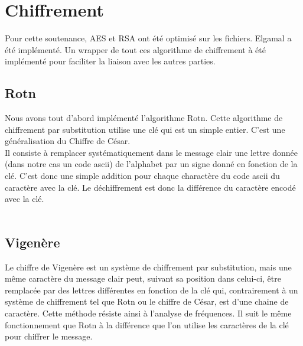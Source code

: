 \section{Chiffrement}
    
        Pour cette soutenance, AES et RSA ont été optimisé sur les fichiers. Elgamal a été implémenté.
        Un wrapper de tout ces algorithme de chiffrement à été implémenté pour faciliter la liaison avec les autres parties.

        \subsection{Rotn}
        Nous avons tout d’abord implémenté l’algorithme Rotn.
        Cette algorithme de chiffrement par substitution utilise une clé qui est un simple entier.
        C’est une généralisation du Chiffre de César. \\
        Il consiste à remplacer systématiquement dans le message clair une lettre donnée (dans notre cas un code ascii) de l'alphabet par un signe donné en fonction de la clé. C’est donc une simple addition pour chaque charactère du code ascii du caractère avec la clé.
        Le déchiffrement est donc la différence du caractère encodé avec la clé. \\ \\

        \subsection{Vigenère}
            Le chiffre de Vigenère est un système de chiffrement par substitution, mais une même caractère du message clair peut, suivant sa position dans celui-ci, être remplacée par des lettres différentes en fonction de la clé qui, contrairement à un système de chiffrement tel que Rotn ou le chiffre de César, est d’une chaine de caractère. Cette méthode résiste ainsi à l'analyse de fréquences. Il suit le même fonctionnement que Rotn à la différence que l’on utilise les caractères de la clé pour chiffrer le message. \\
        
        \newpage

